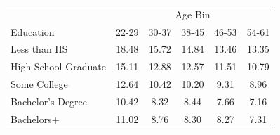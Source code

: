 \begin{tabular}{lccccc}
\hline\hline
 & \multicolumn{5}{c}{Age Bin} \\
Education & 22-29 & 30-37 & 38-45 & 46-53 & 54-61 \\
\hline
Less than HS&18.48&15.72&14.84&13.46&13.35\\
High School Graduate&15.11&12.88&12.57&11.51&10.79\\
Some College&12.64&10.42&10.20&9.31&8.96\\
Bachelor's Degree&10.42&8.32&8.44&7.66&7.16\\
Bachelors+&11.02&8.76&8.30&8.27&7.31\\
\hline\hline
\end{tabular}
